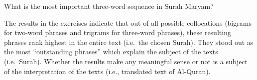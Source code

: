 \documentclass[
]{article}
\newenvironment{Shaded}{\begin{snugshade}}{\end{snugshade}}
\newcommand{\AttributeTok}[1]{\textcolor[rgb]{0.13,0.29,0.53}{#1}}
\newcommand{\ConstantTok}[1]{\textcolor[rgb]{0.56,0.35,0.01}{#1}}
\newcommand{\DecValTok}[1]{\textcolor[rgb]{0.00,0.00,0.81}{#1}}
\newcommand{\FloatTok}[1]{\textcolor[rgb]{0.00,0.00,0.81}{#1}}
\newcommand{\FunctionTok}[1]{\textcolor[rgb]{0.13,0.29,0.53}{\textbf{#1}}}
\newcommand{\NormalTok}[1]{#1}
\newcommand{\OtherTok}[1]{\textcolor[rgb]{0.56,0.35,0.01}{#1}}
\newcommand{\SpecialCharTok}[1]{\textcolor[rgb]{0.81,0.36,0.00}{\textbf{#1}}}
\newcommand{\StringTok}[1]{\textcolor[rgb]{0.31,0.60,0.02}{#1}}
\begin{document}
\footnotesize

\begin{Shaded}
\end{Shaded}

\normalsize

What is the most important three-word sequence in Surah Maryam?

\footnotesize

\begin{Shaded}
\end{Shaded}

\normalsize

The results in the exercises indicate that out of all possible collocations (bigrams for two-word phrases and trigrams for three-word phrases), these resulting phrases rank highest in the entire text (i.e.~the chosen Surah). They stood out as the most ``outstanding phrases'' which explain the subject of the texts (i.e.~Surah). Whether the results make any meaningful sense or not is a subject of the interpretation of the texts (i.e., translated text of Al-Quran).
\end{document}
